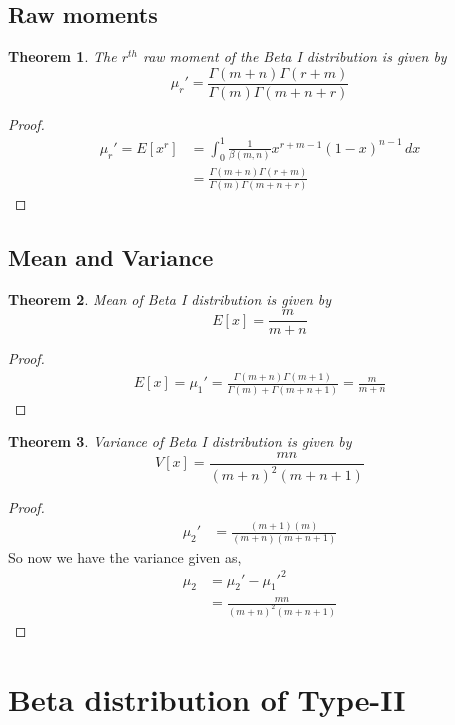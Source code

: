 \documentclass[oneside,11pt,pdftex]{book}%
\numberwithin{equation}{section}
\newtheorem{theorem}{Theorem}[chapter]%
\numberwithin{section}{chapter}
\numberwithin{equation}{chapter}
\begin{document}
\subsection{Raw moments}
\begin{theorem}
	The $ r^{th}$ raw moment of the Beta I distribution is given by \[ \mu_r'=\frac{\Gamma(m+n)\Gamma(r+m)}{\Gamma(m)\Gamma(m+n+r)} \]
\end{theorem}
\begin{proof}
	\begin{align*}
		\mu_{r}'=E[x^r]&=\int_0^1 \frac{1}{\beta(m,n)} x^{r+m-1}(1-x)^{n-1}\, dx\\
		&=\frac{\Gamma(m+n)\Gamma(r+m)}{\Gamma(m)\Gamma(m+n+r)}
	\end{align*}
\end{proof}

\subsection{Mean and Variance}
\begin{theorem}
	Mean of Beta I distribution is given by \[ E[x]=\frac{m}{m+n} \]
\end{theorem}
\begin{proof}
	\begin{align*}
		E[x]=\mu_1'=\frac{\Gamma(m+n)\Gamma(m+1)}{\Gamma(m)+\Gamma(m+n+1)}=\frac{m}{m+n}
	\end{align*}
\end{proof}

\begin{theorem}
	Variance of Beta I distribution is given by \[ V[x]=\frac{mn}{(m+n)^2(m+n+1)} \]
\end{theorem}
\begin{proof}
	\begin{align*}
		\mu_2'&=\frac{(m+1)(m)}{(m+n)(m+n+1)}
	\end{align*}
So now we have the variance given as,
\begin{align*}
	\mu_2&=\mu_2'-\mu_1'^2\\
	&=\frac{mn}{(m+n)^2(m+n+1)}
\end{align*}
\end{proof}

\section{Beta distribution of Type-II}
\end{document}
